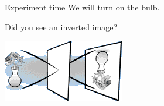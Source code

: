 \begin{frame}{Experiment time}
  We will turn on the bulb.
\end{frame}

\begin{frame}
\end{frame}

\begin{frame}{Did you see an inverted image?}
  \begin{center}
    \includegraphics{media/upside_down_vase.png}
  \end{center}
\end{frame}

